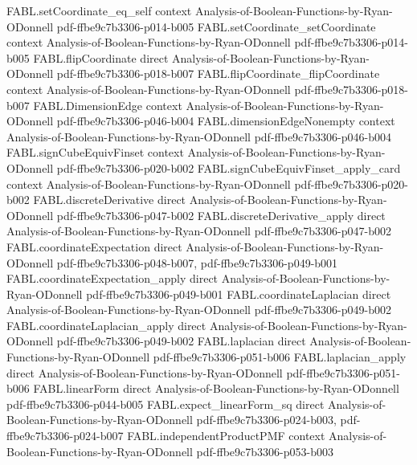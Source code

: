 \begin{theorem}
\proofstep
  {FABL.setCoordinate_eq_self}
  {context}
  {Analysis-of-Boolean-Functions-by-Ryan-ODonnell}
  {pdf-ffbe9c7b3306-p014-b005}
\proofstep
  {FABL.setCoordinate_setCoordinate}
  {context}
  {Analysis-of-Boolean-Functions-by-Ryan-ODonnell}
  {pdf-ffbe9c7b3306-p014-b005}
\proofstep
  {FABL.flipCoordinate}
  {direct}
  {Analysis-of-Boolean-Functions-by-Ryan-ODonnell}
  {pdf-ffbe9c7b3306-p018-b007}
\proofstep
  {FABL.flipCoordinate_flipCoordinate}
  {context}
  {Analysis-of-Boolean-Functions-by-Ryan-ODonnell}
  {pdf-ffbe9c7b3306-p018-b007}
\proofstep
  {FABL.DimensionEdge}
  {context}
  {Analysis-of-Boolean-Functions-by-Ryan-ODonnell}
  {pdf-ffbe9c7b3306-p046-b004}
\proofstep
  {FABL.dimensionEdgeNonempty}
  {context}
  {Analysis-of-Boolean-Functions-by-Ryan-ODonnell}
  {pdf-ffbe9c7b3306-p046-b004}
\proofstep
  {FABL.signCubeEquivFinset}
  {context}
  {Analysis-of-Boolean-Functions-by-Ryan-ODonnell}
  {pdf-ffbe9c7b3306-p020-b002}
\proofstep
  {FABL.signCubeEquivFinset_apply_card}
  {context}
  {Analysis-of-Boolean-Functions-by-Ryan-ODonnell}
  {pdf-ffbe9c7b3306-p020-b002}
\proofstep
  {FABL.discreteDerivative}
  {direct}
  {Analysis-of-Boolean-Functions-by-Ryan-ODonnell}
  {pdf-ffbe9c7b3306-p047-b002}
\proofstep
  {FABL.discreteDerivative_apply}
  {direct}
  {Analysis-of-Boolean-Functions-by-Ryan-ODonnell}
  {pdf-ffbe9c7b3306-p047-b002}
\proofstep
  {FABL.coordinateExpectation}
  {direct}
  {Analysis-of-Boolean-Functions-by-Ryan-ODonnell}
  {pdf-ffbe9c7b3306-p048-b007,
    pdf-ffbe9c7b3306-p049-b001}
\proofstep
  {FABL.coordinateExpectation_apply}
  {direct}
  {Analysis-of-Boolean-Functions-by-Ryan-ODonnell}
  {pdf-ffbe9c7b3306-p049-b001}
\proofstep
  {FABL.coordinateLaplacian}
  {direct}
  {Analysis-of-Boolean-Functions-by-Ryan-ODonnell}
  {pdf-ffbe9c7b3306-p049-b002}
\proofstep
  {FABL.coordinateLaplacian_apply}
  {direct}
  {Analysis-of-Boolean-Functions-by-Ryan-ODonnell}
  {pdf-ffbe9c7b3306-p049-b002}
\proofstep
  {FABL.laplacian}
  {direct}
  {Analysis-of-Boolean-Functions-by-Ryan-ODonnell}
  {pdf-ffbe9c7b3306-p051-b006}
\proofstep
  {FABL.laplacian_apply}
  {direct}
  {Analysis-of-Boolean-Functions-by-Ryan-ODonnell}
  {pdf-ffbe9c7b3306-p051-b006}
\proofstep
  {FABL.linearForm}
  {direct}
  {Analysis-of-Boolean-Functions-by-Ryan-ODonnell}
  {pdf-ffbe9c7b3306-p044-b005}
\proofstep
  {FABL.expect_linearForm_sq}
  {direct}
  {Analysis-of-Boolean-Functions-by-Ryan-ODonnell}
  {pdf-ffbe9c7b3306-p024-b003,
    pdf-ffbe9c7b3306-p024-b007}
\proofstep
  {FABL.independentProductPMF}
  {context}
  {Analysis-of-Boolean-Functions-by-Ryan-ODonnell}
  {pdf-ffbe9c7b3306-p053-b003}

\end{theorem}
